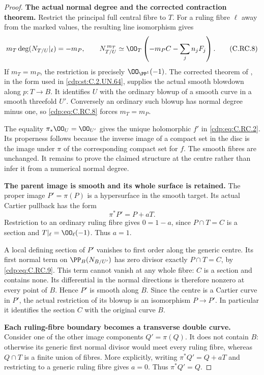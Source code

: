 \begin{proof}
\par\medskip\noindent\textbf{The actual normal degree and the corrected contraction theorem.}
Restrict the principal full central fibre to $T$.
For a ruling fibre $\ell$ away from the marked
values, the resulting line isomorphism gives
\[
       m_T\deg(N_{T/U}|_\ell)=-m_P,\qquad
       N_{T/U}^{\,m_T}
           \simeq\OO_T\left(-m_PC-\sum_jn_jF_j\right).
\tag{C.RC.8}\label{cdp:eq:C.RC.8}
\]
If $m_T=m_P$, the restriction is precisely
$\OO_{\PP^1}(-1)$. The corrected theorem of
\cite[\S2, Theorem~2' and Proposition~9']{FujikiNakano1971},
in the form used in \ref{cdp:st:C.2.UN.64}, supplies the actual
smooth blowdown along $p:T\to B$. It identifies
$U$ with the ordinary blowup of a smooth curve
in a smooth threefold $U'$. Conversely an
ordinary such blowup has normal degree minus
one, so \eqref{cdp:eq:C.RC.8} forces $m_T=m_P$.

The equality $\pi_*\OO_U=\OO_{U'}$ gives the
unique holomorphic $f'$ in \eqref{cdp:eq:C.RC.2}. Its
properness follows because the inverse image
of a compact set in the disc is the image
under $\pi$ of the corresponding compact
set for $f$. The smooth fibres are unchanged.
It remains to prove the claimed structure
at the centre rather than infer it from a
numerical normal degree.

\par\medskip\noindent\textbf{The parent image is smooth and its whole surface is retained.}
The proper image $P'=\pi(P)$ is a hypersurface
in the smooth target. Its actual Cartier
pullback has the form
\[
                            \pi^*P'=P+aT.
\tag{C.RC.9}\label{cdp:eq:C.RC.9}
\]
Restriction to an ordinary ruling fibre
gives $0=1-a$, since $P\cap T=C$ is a
section and $T|_\ell=\OO_\ell(-1)$.
Thus $a=1$.

A local defining section of $P'$ vanishes
to first order along the generic centre.
Its first normal term on $\PP_B(N_{B/U'})$
has zero divisor exactly $P\cap T=C$,
by \eqref{cdp:eq:C.RC.9}. This term cannot vanish at
any whole fibre: $C$ is a section and
contains none. Its differential in the
normal directions is therefore nonzero
at every point of $B$. Hence $P'$ is
smooth along $B$. Since the centre is
a Cartier curve in $P'$, the actual
restriction of its blowup is an
isomorphism $P\to P'$. In particular
it identifies the section $C$ with
the original curve $B$.

\par\medskip\noindent\textbf{Each ruling-fibre boundary becomes a transverse double curve.}
Consider one of the other image components
$Q'=\pi(Q)$. It does not contain $B$:
otherwise its generic first normal
divisor would meet every ruling fibre,
whereas $Q\cap T$ is a finite union
of fibres. More explicitly, writing
$\pi^*Q'=Q+aT$ and restricting to a
generic ruling fibre gives $a=0$.
Thus $\pi^*Q'=Q$.


\end{proof}
